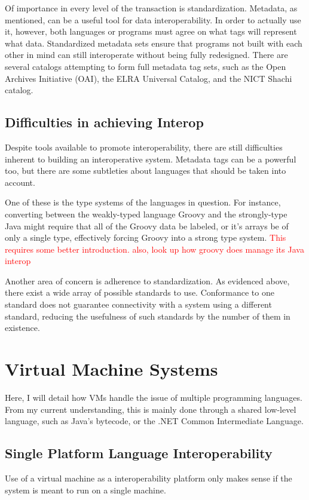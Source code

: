 \documentclass{sig-alternate}
\newcommand{\mycomment}[1]{\textcolor{red}{#1}}
\begin{document}
Of importance in every level of the transaction is standardization. Metadata, as mentioned, can be a useful tool for data interoperability. In order to actually use it, however, both languages or programs must agree on what tags will represent what data. Standardized metadata sets ensure that programs not built with each other in mind can still interoperate without being fully redesigned. There are several catalogs attempting to form full metadata tag sets, such as the Open Archives Initiative (OAI), the ELRA Universal Catalog, and the NICT Shachi catalog.\cite{Ide:2010}

\subsection*{Difficulties in achieving Interop}
Despite tools available to promote interoperability, there are still difficulties inherent to building an interoperative system. Metadata tags can be a powerful too, but there are some subtleties about languages that should be taken into account.

One of these is the type systems of the languages in question. For instance, converting between the weakly-typed language Groovy and the strongly-type Java might require that all of the Groovy data be labeled, or it's arrays be of only a single type, effectively forcing Groovy into a strong type system. \mycomment{This requires some better introduction. also, look up how groovy does manage its Java interop}

Another area of concern is adherence to standardization.
As evidenced above, there exist a wide array of possible standards to use. Conformance to one standard does not guarantee connectivity with a system using a different standard, reducing the usefulness of such standards by the number of them in existence.\cite{?}



\section{Virtual Machine Systems}\label{VM}
Here, I will detail how VMs handle the issue of multiple programming languages.
From my current understanding, this is mainly done through a shared low-level language, such as Java's bytecode, or the .NET Common Intermediate Language.

\subsection*{Single Platform Language Interoperability}
Use of a virtual machine as a interoperability platform only makes sense if the system is meant to run on a single machine.
\end{document}
